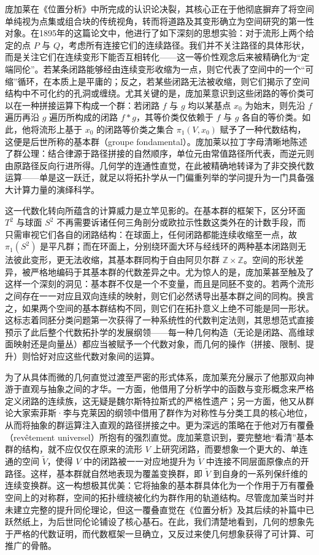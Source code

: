 \documentclass[12pt,a4paper]{article}
\begin{document}
庞加莱在《位置分析》中所完成的认识论决裂，其核心正在于他彻底摒弃了将空间单纯视为点集或组合块的传统视角，转而将道路及其变形确立为空间研究的第一性对象。在1895年的这篇论文中，他进行了如下深刻的思想实验：对于流形上两个给定的点 $P$ 与 $Q$，考虑所有连接它们的连续路径。我们并不关注路径的具体形状，而是关注它们在连续变形下能否互相转化——这一等价性观念后来被精确化为“定端同伦”。若某条闭路能够经由连续变形收缩为一点，则它代表了空间中的一个“可缩”循环，在本质上是平庸的；反之，若某些闭路无法被收缩，则它们揭示了空间结构中不可化约的孔洞或缠绕。尤其关键的是，庞加莱意识到这些闭路的等价类可以在一种拼接运算下构成一个群：若闭路 $f$ 与 $g$ 均以某基点 $x_0$ 为始末，则先沿 $f$ 遍历再沿 $g$ 遍历所构成的闭路 $f \ast g$，其等价类仅依赖于 $f$ 与 $g$ 各自的等价类。如此，他将流形上基于 $x_0$ 的闭路等价类之集合 $\pi_1(V, x_0)$ 赋予了一种代数结构，这便是后世所称的基本群（groupe fondamental）。庞加莱以拉丁字母清晰地陈述了群公理：结合律源于路径拼接的自然顺序，单位元由常值路径所代表，而逆元则由原路径反向行进所得。几何学的连通性直觉，在此被精确地转译为了非交换代数运算——单是这一跃迁，就足以将拓扑学从一门偏重列举的学问提升为一门具备强大计算力量的演绎科学。

这一代数化转向所蕴含的计算威力是立竿见影的。在基本群的框架下，区分环面 $T^2$ 与球面 $S^2$ 不再需要诉诸任何三角剖分或欧拉示性数这类外在的计数手段，而只需审视它们各自的闭路结构：在球面上，任何闭路都能连续收缩至一点，故 $\pi_1(S^2)$ 是平凡群；而在环面上，分别绕环面大环与经线环的两种基本闭路则无法彼此变形，更无法收缩，其基本群同构于自由阿贝尔群 $\mathbb{Z} \times \mathbb{Z}$。空间的形状差异，被严格地编码于其基本群的代数差异之中。尤为惊人的是，庞加莱甚至触及了这样一个深刻的洞见：基本群不仅是一个不变量，而且是同胚不变的。若两个流形之间存在一一对应且双向连续的映射，则它们必然诱导出基本群之间的同构。换言之，如果两个空间的基本群结构不同，则它们在拓扑意义上绝不可能是同一形状。这标志着同胚分类问题第一次获得了一种系统性的代数判定法则，其思想范式直接预示了此后整个代数拓扑学的发展纲领——每一种几何构造（无论是闭路、高维球面映射还是向量丛）都应当被赋予一个代数对象，而几何的操作（拼接、限制、提升）则恰好对应这些代数对象间的运算。

为了从具体而微的几何直觉过渡至严密的形式体系，庞加莱充分展示了他那双向神游于直观与抽象之间的才华。一方面，他借用了分析学中的函数与变形概念来严格定义闭路的连续族，这无疑是魏尔斯特拉斯式的严格性遗产；另一方面，他又从群论大家索菲斯·李与克莱因的纲领中借用了群作为对称性与分类工具的核心地位，从而将抽象的群运算注入直观的路径拼接之中。更为深远的策略在于他对万有覆叠（revêtement universel）所抱有的强烈直觉。庞加莱意识到，要完整地“看清”基本群的结构，就不应仅仅在原来的流形 $V$ 上研究闭路，而要想象一个更大的、单连通的空间 $\tilde{V}$，使得 $V$ 中的闭路被一一对应地提升为 $\tilde{V}$ 中连接不同层面原像点的开路径。这样，基本群就自然地表现为覆盖变换群，即 $\tilde{V}$ 到自身的一系列保纤维的连续变换群。这一构想极其优美：它将抽象的基本群具体化为一个作用于万有覆叠空间上的对称群，空间的拓扑缠绕被化约为群作用的轨道结构。尽管庞加莱当时并未建立完整的提升同伦理论，但这一覆叠直觉在《位置分析》及其后续的补篇中已跃然纸上，为后世同伦论铺设了核心基石。在此，我们清楚地看到，几何的想象先于严格的代数证明，而代数框架一旦确立，又反过来使几何想象获得了可计算、可推广的骨骼。
\end{document}

